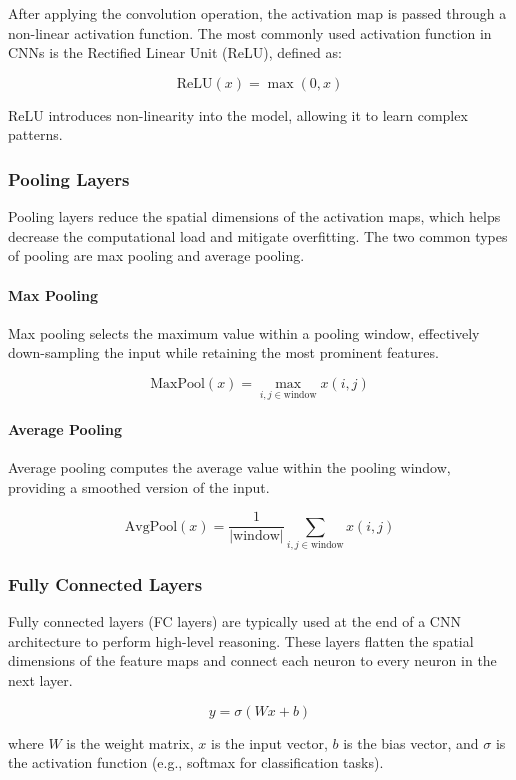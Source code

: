 \documentclass[12pt]{article}
\begin{document}
After applying the convolution operation, the activation map is passed through a non-linear activation function. The most commonly used activation function in CNNs is the Rectified Linear Unit (ReLU), defined as:

\[
\text{ReLU}(x) = \max(0, x)
\]

ReLU introduces non-linearity into the model, allowing it to learn complex patterns.

\subsubsection{Pooling Layers}

Pooling layers reduce the spatial dimensions of the activation maps, which helps decrease the computational load and mitigate overfitting. The two common types of pooling are max pooling and average pooling.

\paragraph{Max Pooling}

Max pooling selects the maximum value within a pooling window, effectively down-sampling the input while retaining the most prominent features.

\[
\text{MaxPool}(x) = \max_{i, j \in \text{window}} x(i, j)
\]

\paragraph{Average Pooling}

Average pooling computes the average value within the pooling window, providing a smoothed version of the input.

\[
\text{AvgPool}(x) = \frac{1}{|\text{window}|} \sum_{i, j \in \text{window}} x(i, j)
\]

\subsubsection{Fully Connected Layers}

Fully connected layers (FC layers) are typically used at the end of a CNN architecture to perform high-level reasoning. These layers flatten the spatial dimensions of the feature maps and connect each neuron to every neuron in the next layer.

\[
y = \sigma(Wx + b)
\]

where \( W \) is the weight matrix, \( x \) is the input vector, \( b \) is the bias vector, and \( \sigma \) is the activation function (e.g., softmax for classification tasks).
\end{document}
